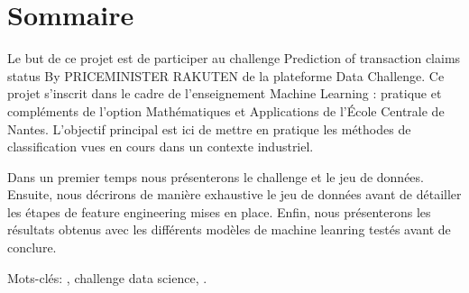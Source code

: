 
\chapter{Sommaire}

Le but de ce projet est de participer au challenge Prediction of transaction claims 
status By PRICEMINISTER RAKUTEN de la plateforme Data Challenge. Ce projet s'inscrit dans
le cadre de l'enseignement Machine Learning : pratique et compléments de l'option
Mathématiques et Applications de l'École Centrale de Nantes. L'objectif principal est ici
de mettre en pratique les méthodes de classification vues en cours dans un contexte 
industriel.

Dans un premier temps nous présenterons le challenge et le jeu de données. Ensuite, nous 
décrirons de manière exhaustive le jeu de données avant de détailler les étapes de
feature engineering mises en place. Enfin, nous présenterons les résultats obtenus avec
les différents modèles de machine leanring testés avant de conclure.

\vspace{1cm}

Mots-clés: , challenge data science, \Python.

\vfill
